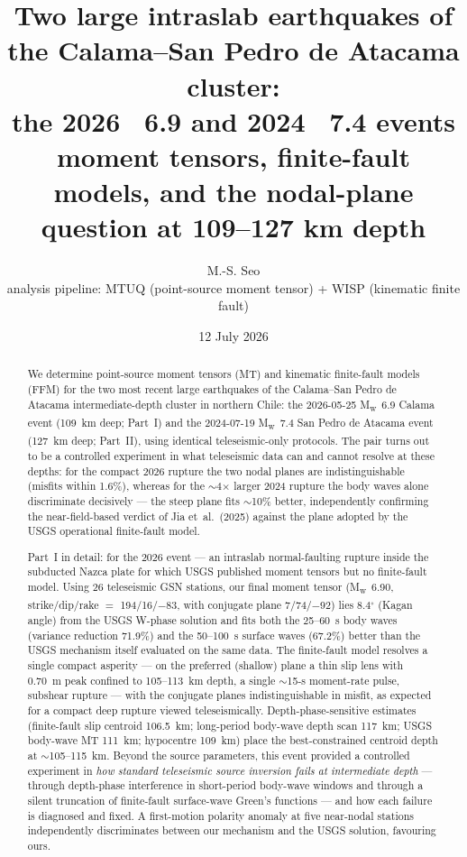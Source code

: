 \documentclass[11pt]{article}
\title{\textbf{Two large intraslab earthquakes of the Calama--San Pedro de Atacama
cluster:\\the 2026 \Mw~6.9 and 2024 \Mw~7.4 events\\
\large moment tensors, finite-fault models, and the nodal-plane question at 109--127 km depth}}
\author{M.-S. Seo\\ \small analysis pipeline: MTUQ (point-source moment tensor) + WISP (kinematic finite fault)}
\date{12 July 2026}
\newcommand{\Mw}{M\textsubscript{w}}
\begin{document}
\maketitle

\begin{abstract}
We determine point-source moment tensors (MT) and kinematic finite-fault models (FFM) for the
two most recent large earthquakes of the Calama--San Pedro de Atacama intermediate-depth
cluster in northern Chile: the 2026-05-25 \Mw~6.9 Calama event (109~km deep; Part~I) and the
2024-07-19 \Mw~7.4 San Pedro de Atacama event (127~km deep; Part~II), using identical
teleseismic-only protocols. The pair turns out to be a controlled experiment in what
teleseismic data can and cannot resolve at these depths: for the compact 2026 rupture the two
nodal planes are indistinguishable (misfits within 1.6\%), whereas for the $\sim$4$\times$
larger 2024 rupture the body waves alone discriminate decisively --- the steep plane fits
$\sim$10\% better, independently confirming the near-field-based verdict of Jia et~al.\ (2025)
against the plane adopted by the USGS operational finite-fault model.

Part~I in detail: for the 2026 event ---
an intraslab normal-faulting rupture inside the subducted Nazca plate for which USGS
published moment tensors but no finite-fault model. Using 26 teleseismic GSN stations, our
final moment tensor (\Mw~6.90, strike/dip/rake $=$ 194/16/$-$83, with conjugate plane
7/74/$-$92) lies 8.4$^\circ$ (Kagan angle) from the USGS W-phase solution and fits both the
25--60~s body waves (variance reduction 71.9\%) and the 50--100~s surface waves (67.2\%)
better than the USGS mechanism itself evaluated on the same data. The finite-fault model
resolves a single compact asperity --- on the preferred (shallow) plane a thin slip lens
with 0.70~m peak confined to 105--113~km depth, a single
$\sim$15-s moment-rate pulse, subshear rupture --- with the conjugate planes indistinguishable
in misfit, as expected for a compact deep rupture viewed teleseismically. Depth-phase-sensitive
estimates (finite-fault slip centroid 106.5~km; long-period body-wave depth scan 117~km; USGS
body-wave MT 111~km; hypocentre 109~km) place the best-constrained centroid depth at
$\sim$105--115~km. Beyond the source parameters, this event provided a controlled experiment
in \emph{how standard teleseismic source inversion fails at intermediate depth} --- through
depth-phase interference in short-period body-wave windows and through a silent truncation of
finite-fault surface-wave Green's functions --- and how each failure is diagnosed and fixed. A
first-motion polarity anomaly at five near-nodal stations independently discriminates between
our mechanism and the USGS solution, favouring ours.
\end{abstract}
\end{document}
